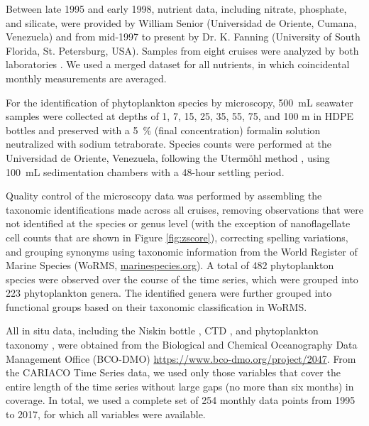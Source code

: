 \documentclass[draft]{agujournal2019}
\begin{document}
    Between late 1995 and early 1998, nutrient data, including nitrate, phosphate, and silicate, were provided by William Senior (Universidad de Oriente, Cumana, Venezuela) and from mid-1997 to present by Dr. K. Fanning (University of South Florida, St. Petersburg, USA). Samples from eight cruises were analyzed by both laboratories \cite{taylor_ecosystem_2012}. We used a merged dataset for all nutrients, in which coincidental monthly measurements are averaged.
       
    For the identification of phytoplankton species by microscopy, \qty{500}{\milli\liter} seawater samples were collected at depths of 1, 7, 15, 25, 35, 55, 75, and 100 m in HDPE bottles and preserved with a \qty{5}{\%} (final concentration) formalin solution neutralized with sodium tetraborate. Species counts were performed at the Universidad de Oriente, Venezuela, following the Utermöhl method \cite{hasle1978inverted}, using \qty{100}{\milli\liter} sedimentation chambers with a 48-hour settling period. 

    Quality control of the microscopy data was performed by assembling the taxonomic identifications made across all cruises, removing observations that were not identified at the species or genus level (with the exception of nanoflagellate cell counts that are shown in Figure \ref{fig:zscore}), correcting spelling variations, and grouping synonyms using taxonomic information from the World Register of Marine Species (WoRMS, \url{marinespecies.org}). A total of 482 phytoplankton species were observed over the course of the time series, which were grouped into 223 phytoplankton genera. The identified genera were further grouped into functional groups based on their taxonomic classification in WoRMS.

    
    All in situ data, including the Niskin bottle \cite{mullerkarger2019niskin}, CTD \cite{mullerkarger2019ctd}, and phytoplankton taxonomy \cite{troccoli2019phytoplankton}, were obtained from the Biological and Chemical Oceanography Data Management Office (BCO-DMO) \url{https://www.bco-dmo.org/project/2047}. 
    From the CARIACO Time Series data, we used only those variables that cover the entire length of the time series without large gaps (no more than six months) in coverage. In total, we used a complete set of 254 monthly data points from 1995 to 2017, for which all variables were available.
\end{document}
